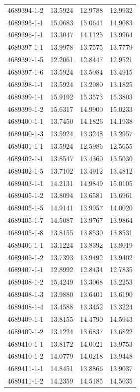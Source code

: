 \begin{longtable}{lrrr}
4689394-1-2 & 13.5924 & 12.9788 & 12.9932 \\
4689395-1-1 & 15.0683 & 15.0641 & 14.9083 \\
4689396-1-1 & 13.3047 & 14.1125 & 13.9964 \\
4689397-1-1 & 13.9978 & 13.7575 & 13.7779 \\
4689397-1-5 & 12.2061 & 12.8447 & 12.9521 \\
4689397-1-6 & 13.5924 & 13.5084 & 13.4915 \\
4689398-1-1 & 13.5924 & 13.2080 & 13.1825 \\
4689399-1-1 & 15.9192 & 15.3573 & 15.3803 \\
4689399-1-2 & 15.6317 & 14.9900 & 15.0233 \\
4689400-1-1 & 13.7450 & 14.1826 & 14.1938 \\
4689400-1-3 & 13.5924 & 13.3248 & 13.2957 \\
4689401-1-1 & 13.5924 & 12.5986 & 12.5655 \\
4689402-1-1 & 13.8547 & 13.4360 & 13.5030 \\
4689402-1-5 & 13.7102 & 13.4912 & 13.4812 \\
4689403-1-1 & 14.2131 & 14.9849 & 15.0105 \\
4689405-1-2 & 13.8094 & 13.6581 & 13.6961 \\
4689405-1-5 & 14.9141 & 13.9957 & 14.0020 \\
4689405-1-7 & 14.5087 & 13.9767 & 13.9864 \\
4689405-1-8 & 13.8155 & 13.8530 & 13.8531 \\
4689406-1-1 & 13.1224 & 13.8392 & 13.8019 \\
4689406-1-2 & 13.7393 & 13.9492 & 13.9402 \\
4689407-1-1 & 12.8992 & 12.8434 & 12.7835 \\
4689408-1-2 & 15.4249 & 13.3068 & 13.2253 \\
4689408-1-3 & 13.9880 & 13.6401 & 13.6190 \\
4689408-1-4 & 13.4588 & 13.3452 & 13.3224 \\
4689409-1-1 & 13.8155 & 14.4790 & 14.5943 \\
4689409-1-2 & 13.1224 & 13.6837 & 13.6822 \\
4689410-1-1 & 13.8172 & 14.0021 & 13.9753 \\
4689410-1-2 & 14.0779 & 14.0218 & 13.9448 \\
4689411-1-1 & 14.8451 & 13.8866 & 13.9037 \\
4689411-1-2 & 14.2359 & 14.5185 & 14.5035 \\

\end{longtable}
